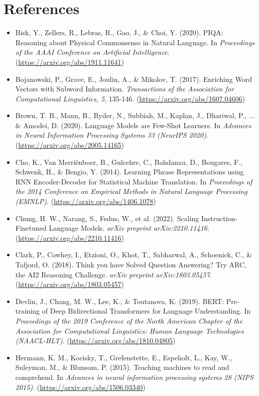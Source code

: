 \documentclass[10.5pt]{article}
\begin{document}
\newpage
\section*{References}
\begin{itemize}
    \item Bisk, Y., Zellers, R., Lebras, R., Gao, J., \& Choi, Y. (2020). PIQA: Reasoning about Physical Commonsense in Natural Language. In \textit{Proceedings of the AAAI Conference on Artificial Intelligence}. (\url{https://arxiv.org/abs/1911.11641})
    \item Bojanowski, P., Grave, E., Joulin, A., \& Mikolov, T. (2017). Enriching Word Vectors with Subword Information. \textit{Transactions of the Association for Computational Linguistics, 5}, 135-146. (\url{https://arxiv.org/abs/1607.04606})
    \item Brown, T. B., Mann, B., Ryder, N., Subbiah, M., Kaplan, J., Dhariwal, P., ... \& Amodei, D. (2020). Language Models are Few-Shot Learners. In \textit{Advances in Neural Information Processing Systems 33 (NeurIPS 2020)}. (\url{https://arxiv.org/abs/2005.14165})
    \item Cho, K., Van Merriënboer, B., Gulcehre, C., Bahdanau, D., Bougares, F., Schwenk, H., \& Bengio, Y. (2014). Learning Phrase Representations using RNN Encoder-Decoder for Statistical Machine Translation. In \textit{Proceedings of the 2014 Conference on Empirical Methods in Natural Language Processing (EMNLP)}. (\url{https://arxiv.org/abs/1406.1078})
    \item Chung, H. W., Narang, S., Fedus, W., et al. (2022). Scaling Instruction-Finetuned Language Models. \textit{arXiv preprint arXiv:2210.11416}. (\url{https://arxiv.org/abs/2210.11416})
    \item Clark, P., Cowhey, I., Etzioni, O., Khot, T., Sabharwal, A., Schoenick, C., \& Tafjord, O. (2018). Think you have Solved Question Answering? Try ARC, the AI2 Reasoning Challenge. \textit{arXiv preprint arXiv:1803.05457}. (\url{https://arxiv.org/abs/1803.05457})
    \item Devlin, J., Chang, M. W., Lee, K., \& Toutanova, K. (2019). BERT: Pre-training of Deep Bidirectional Transformers for Language Understanding. In \textit{Proceedings of the 2019 Conference of the North American Chapter of the Association for Computational Linguistics: Human Language Technologies (NAACL-HLT)}. (\url{https://arxiv.org/abs/1810.04805})
    \item Hermann, K. M., Kocisky, T., Grefenstette, E., Espeholt, L., Kay, W., Suleyman, M., \& Blunsom, P. (2015). Teaching machines to read and comprehend. In \textit{Advances in neural information processing systems 28 (NIPS 2015)}. (\url{https://arxiv.org/abs/1506.03340})

\end{itemize}
\end{document}
